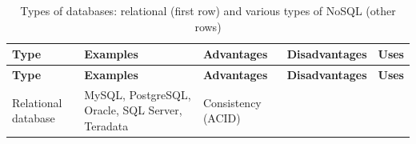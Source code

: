 \documentclass[]{krantz}
\begin{document}
\begin{longtable}[]{@{}lllll@{}}
\caption{\label{tab:table4-3} Types of databases: relational (first row) and
various types of NoSQL (other rows)}\tabularnewline
\toprule
\begin{minipage}[b]{0.07\columnwidth}\raggedright\strut
\textbf{Type}\strut
\end{minipage} & \begin{minipage}[b]{0.16\columnwidth}\raggedright\strut
\textbf{Examples}\strut
\end{minipage} & \begin{minipage}[b]{0.22\columnwidth}\raggedright\strut
\textbf{Advantages}\strut
\end{minipage} & \begin{minipage}[b]{0.20\columnwidth}\raggedright\strut
\textbf{Disadvantages}\strut
\end{minipage} & \begin{minipage}[b]{0.21\columnwidth}\raggedright\strut
\textbf{Uses}\strut
\end{minipage}\tabularnewline
\midrule
\endfirsthead
\toprule
\begin{minipage}[b]{0.07\columnwidth}\raggedright\strut
\textbf{Type}\strut
\end{minipage} & \begin{minipage}[b]{0.16\columnwidth}\raggedright\strut
\textbf{Examples}\strut
\end{minipage} & \begin{minipage}[b]{0.22\columnwidth}\raggedright\strut
\textbf{Advantages}\strut
\end{minipage} & \begin{minipage}[b]{0.20\columnwidth}\raggedright\strut
\textbf{Disadvantages}\strut
\end{minipage} & \begin{minipage}[b]{0.21\columnwidth}\raggedright\strut
\textbf{Uses}\strut
\end{minipage}\tabularnewline
\midrule
\endhead
\begin{minipage}[t]{0.07\columnwidth}\raggedright\strut
Relational database\strut
\end{minipage} & \begin{minipage}[t]{0.16\columnwidth}\raggedright\strut
MySQL, PostgreSQL, Oracle, SQL Server, Teradata\strut
\end{minipage} & \begin{minipage}[t]{0.22\columnwidth}\raggedright\strut
Consistency (ACID)\strut
\end{minipage} & \begin{minipage}[t]{0.20\columnwidth}\raggedright\strut

\end{minipage}
\end{longtable}
\end{document}

